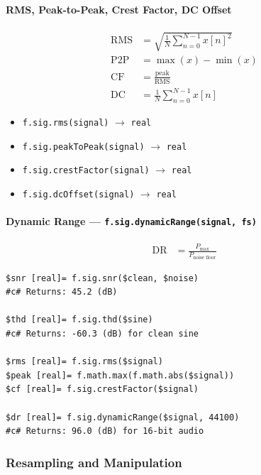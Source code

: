 \paragraph{RMS, Peak-to-Peak, Crest Factor, DC Offset}

\begin{align}
\text{RMS} &= \sqrt{\frac{1}{N} \sum_{n=0}^{N-1} x[n]^2} \label{eq:sig-rms} \\
\text{P2P} &= \max(x) - \min(x) \label{eq:sig-p2p} \\
\text{CF} &= \frac{\text{peak}}{\text{RMS}} \label{eq:sig-cf} \\
\text{DC} &= \frac{1}{N} \sum_{n=0}^{N-1} x[n] \label{eq:sig-dc}
\end{align}

\begin{itemize}
\item \texttt{f.sig.rms(signal)} $\to$ \texttt{real}
\item \texttt{f.sig.peakToPeak(signal)} $\to$ \texttt{real}
\item \texttt{f.sig.crestFactor(signal)} $\to$ \texttt{real}
\item \texttt{f.sig.dcOffset(signal)} $\to$ \texttt{real}
\end{itemize}

\paragraph{Dynamic Range --- \texttt{f.sig.dynamicRange(signal, fs)}}

\begin{align}
\text{DR} &= \frac{P_{\text{max}}}{P_{\text{noise floor}}} \label{eq:sig-dr}
\end{align}

\begin{verbatim}
$snr [real]= f.sig.snr($clean, $noise)
#c# Returns: 45.2 (dB)

$thd [real]= f.sig.thd($sine)
#c# Returns: -60.3 (dB) for clean sine

$rms [real]= f.sig.rms($signal)
$peak [real]= f.math.max(f.math.abs($signal))
$cf [real]= f.sig.crestFactor($signal)

$dr [real]= f.sig.dynamicRange($signal, 44100)
#c# Returns: 96.0 (dB) for 16-bit audio
\end{verbatim}

\subsubsection{Resampling and Manipulation}

